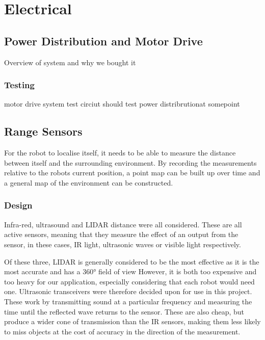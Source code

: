 
\chapter{Electrical}\label{electrical}

\section{Power Distribution and Motor Drive}\label{elec/poweranddrive}
Overview of system and why we bought it
\subsection{Testing}\label{elec/poweranddrive/test}
motor drive system test circiut
should test power distribrutionat somepoint 


\section{Range Sensors}\label{elec/range}
For the robot to localise itself, it needs to be able to measure the distance between itself and the surrounding environment. By recording the measurements relative to the robots current position, a point map can be built up over time and a general map of the environment can be constructed. 

\subsection{Design}\label{elec/range/design}
Infra-red, ultrasound and LIDAR distance were all considered. These are all active sensors, meaning that they measure the effect of an output from the sensor, in these cases, IR light, ultrasonic waves or visible light respectively. 

Of these three, LIDAR is generally considered to be the most effective as it is the most accurate and has a \ang{360} field of view However, it is both too expensive and too heavy for our application, especially considering that each robot would need one. 
Ultrasonic transceivers were therefore decided upon for use in this project. These work by transmitting sound at a particular frequency and measuring the time until the reflected wave returns to the sensor. These are also cheap, but produce a wider cone of transmission than the IR sensors, making them less likely to miss objects at the cost of accuracy in the direction of the measurement. 

